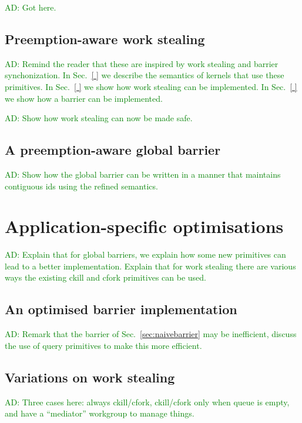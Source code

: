 \documentclass[nocopyrightspace]{sigplanconf-pldi16}
\newcommand{\ADComment}[1]{\textcolor{green}{AD: #1}}
\newcommand{\mysec}{Sec.~}
\begin{document}
\ADComment{Got here.}




\subsection{Preemption-aware work stealing}

\ADComment{Remind the reader that these are inspired by work stealing
  and barrier synchonization.  In \mysec\ref{ } we describe the
  semantics of kernels that use these primitives.  In \mysec\ref{ } we
  show how work stealing can be implemented.  In \mysec\ref{ } we show
  how a barrier can be implemented.}

\ADComment{Show how work stealing can now be made safe.}

\subsection{A preemption-aware global barrier}

\ADComment{Show how the global barrier can be written in a manner that
  maintains contiguous ids using the refined semantics.}


\section{Application-specific optimisations}

\ADComment{Explain that for global barriers, we explain how some new
  primitives can lead to a better implementation.  Explain that for
  work stealing there are various ways the existing ckill and cfork
  primitives can be used.}

\subsection{An optimised barrier implementation}

\ADComment{Remark that the barrier of \mysec\ref{sec:naivebarrier} may
  be inefficient, discuss the use of query primitives to make this
  more efficient.}

\subsection{Variations on work stealing}

\ADComment{Three cases here: always ckill/cfork, ckill/cfork only when
  queue is empty, and have a ``mediator'' workgroup to manage things.}
\end{document}

